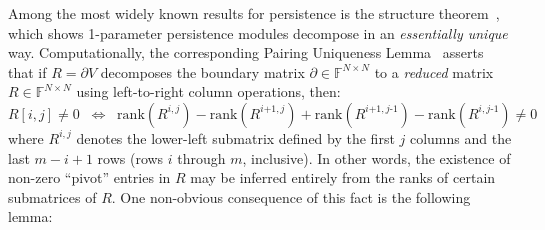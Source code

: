 \documentclass[10pt]{article}
\numberwithin{equation}{section}
\newcommand{\+}{%
	\raisebox{0.18ex}{\scaleobj{0.55}{+}}
}
\theoremstyle{definition}
\theoremstyle{definition}
\begin{document}
Among the most widely known results for persistence is the structure theorem~\cite{zomorodian2004computing}, which shows 1-parameter persistence modules decompose in an \emph{essentially unique} way. Computationally, 
the corresponding Pairing Uniqueness Lemma~\cite{edelsbrunner2000topological} asserts that if $R = \partial V$ decomposes the boundary matrix $\partial \in \mathbb{F}^{N \times N}$ to a \emph{reduced} matrix $R \in \mathbb{F}^{N \times N}$ using left-to-right column operations, then:
\begin{equation}\label{eq:uniq_pivot}
R[i,j] \neq 0 \;\; \Leftrightarrow \;\; \mathrm{rank}(R^{i,j}) - \mathrm{rank}(R^{i\texttt{+}1,j}) + \mathrm{rank}(R^{i\texttt{+}1,j\text{-}1}) - \mathrm{rank}(R^{i,j\text{-}1}) \neq 0 
\end{equation}
where $R^{i, j}$ denotes the lower-left submatrix defined by the first $j$ columns and the last $m - i + 1$ rows (rows $i$ through $m$, inclusive). 
In other words, the existence of non-zero ``pivot'' entries in $R$ may be inferred entirely from the ranks of certain submatrices of $R$. One non-obvious consequence of this fact is the following lemma:   
\end{document}
